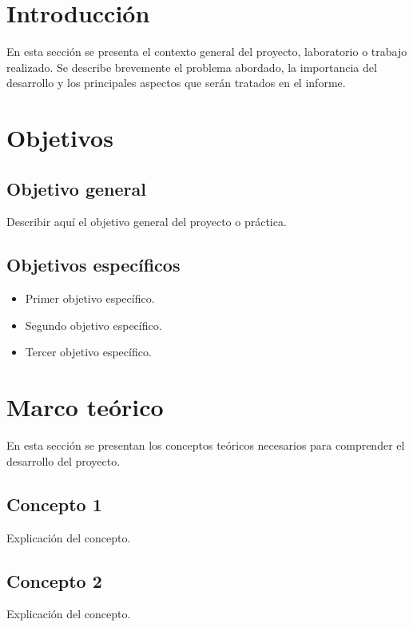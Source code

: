 \documentclass[12pt,a4paper]{article}
\begin{document}
\section{Introducción}

En esta sección se presenta el contexto general del proyecto,
laboratorio o trabajo realizado. Se describe brevemente el
problema abordado, la importancia del desarrollo y los
principales aspectos que serán tratados en el informe.

\section{Objetivos}

\subsection{Objetivo general}

Describir aquí el objetivo general del proyecto o práctica.

\subsection{Objetivos específicos}

\begin{itemize}
    \item Primer objetivo específico.
    \item Segundo objetivo específico.
    \item Tercer objetivo específico.
\end{itemize}

\section{Marco teórico}

En esta sección se presentan los conceptos teóricos necesarios
para comprender el desarrollo del proyecto.

\subsection{Concepto 1}

Explicación del concepto.

\subsection{Concepto 2}

Explicación del concepto.
\end{document}
